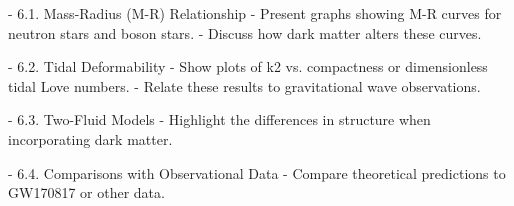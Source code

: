 - 6.1. Mass-Radius (M-R) Relationship 
     - Present graphs showing M-R curves for neutron stars and boson stars.  
     - Discuss how dark matter alters these curves.  

- 6.2. Tidal Deformability 
     - Show plots of k2 vs. compactness or dimensionless tidal Love numbers.  
     - Relate these results to gravitational wave observations.  

- 6.3. Two-Fluid Models
     - Highlight the differences in structure when incorporating dark matter.  

- 6.4. Comparisons with Observational Data  
     - Compare theoretical predictions to GW170817 or other data.  
